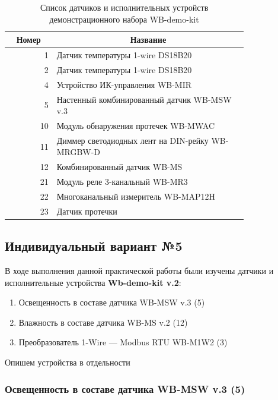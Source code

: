\documentclass[a4paper,14pt]{extarticle}
\begin{document}
\begin{center}
	\begin{table}[htbp]
	\begin{tabular}{|r|p{0.8\linewidth}|}
		\hline
		\multicolumn{1}{|c|}{\textbf{Номер}} & \multicolumn{1}{c|}{\textbf{Название}} \\ \hline\hline
		1 & Датчик температуры 1-wire DS18B20 \\ \hline
		2 & Датчик температуры 1-wire DS18B20 \\ \hline
		4 & Устройство ИК-управления WB-MIR \\ \hline
		5 & Настенный комбинированный датчик WB-MSW v.3 \\ \hline
		10 & Модуль обнаружения протечек WB-MWAC \\ \hline
		11 & Диммер светодиодных лент на DIN-рейку WB-MRGBW-D \\ \hline
		12 & Комбинированный датчик WB-MS \\ \hline
		21 & Модуль реле 3-канальный WB-MR3 \\ \hline
		22 & Многоканальный измеритель WB-MAP12H \\ \hline
		23 & Датчик протечки \\ \hline
	\end{tabular}
    \caption{Список датчиков и исполнительных устройств демонстрационного набора WB-demo-kit}
	\label{tab:device-list}
\end{table}
\end{center}



	
\subsection*{Индивидуальный вариант №5}
В ходе выполнения данной практической работы были изучены датчики и исполнительные устройства \textbf{Wb-demo-kit v.2}:

\begin{enumerate}
	\item Освещенность в составе датчика WB-MSW v.3 (5)
	\item Влажность в составе датчика WB-MS v.2 (12)
	\item Преобразователь 1-Wire — Modbus RTU WB-M1W2 (3)
\end{enumerate}

Опишем устройства в отдельности
\subsubsection*{Освещенность в составе датчика WB-MSW v.3 (5)}
\end{document}

